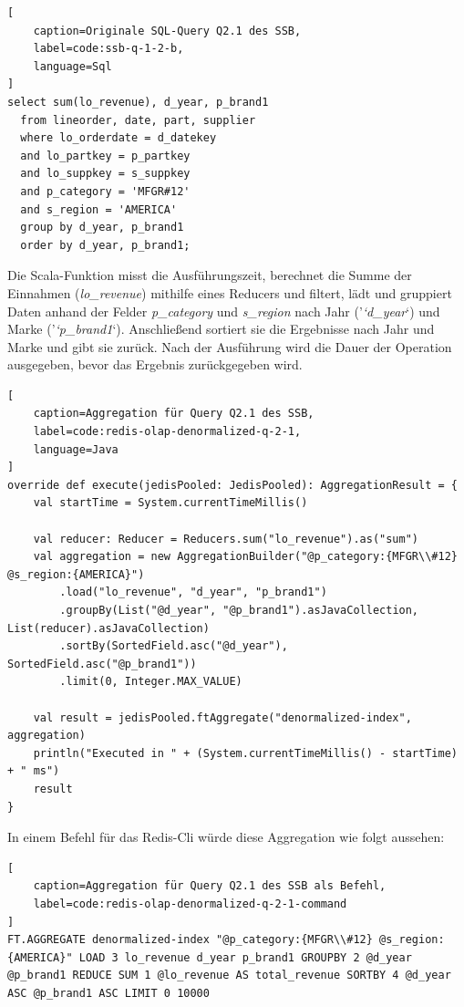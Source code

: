 \begin{lstlisting}[
    caption=Originale SQL-Query Q2.1 des SSB,
    label=code:ssb-q-1-2-b,
    language=Sql
]
select sum(lo_revenue), d_year, p_brand1
  from lineorder, date, part, supplier
  where lo_orderdate = d_datekey
  and lo_partkey = p_partkey
  and lo_suppkey = s_suppkey
  and p_category = 'MFGR#12'
  and s_region = 'AMERICA'
  group by d_year, p_brand1
  order by d_year, p_brand1;
\end{lstlisting}


Die Scala-Funktion misst die Ausführungszeit, berechnet die Summe der Einnahmen (\emph{lo\_revenue}) mithilfe eines Reducers und filtert, lädt und gruppiert Daten anhand der Felder \emph{p\_category} und \emph{s\_region} nach Jahr ('\emph{`d\_year}`) und Marke ('\emph{`p\_brand1}`). Anschließend sortiert sie die Ergebnisse nach Jahr und Marke und gibt sie zurück. Nach der Ausführung wird die Dauer der Operation ausgegeben, bevor das Ergebnis zurückgegeben wird.

\begin{lstlisting}[
    caption=Aggregation für Query Q2.1 des SSB,
    label=code:redis-olap-denormalized-q-2-1,
    language=Java
]
override def execute(jedisPooled: JedisPooled): AggregationResult = {
	val startTime = System.currentTimeMillis()

	val reducer: Reducer = Reducers.sum("lo_revenue").as("sum")
	val aggregation = new AggregationBuilder("@p_category:{MFGR\\#12} @s_region:{AMERICA}")
		.load("lo_revenue", "d_year", "p_brand1")
		.groupBy(List("@d_year", "@p_brand1").asJavaCollection, List(reducer).asJavaCollection)
		.sortBy(SortedField.asc("@d_year"), SortedField.asc("@p_brand1"))
		.limit(0, Integer.MAX_VALUE)

	val result = jedisPooled.ftAggregate("denormalized-index", aggregation)
	println("Executed in " + (System.currentTimeMillis() - startTime) + " ms")
	result
}
\end{lstlisting}

In einem Befehl für das Redis-Cli würde diese Aggregation wie folgt aussehen:
\begin{lstlisting}[
    caption=Aggregation für Query Q2.1 des SSB als Befehl,
    label=code:redis-olap-denormalized-q-2-1-command
]
FT.AGGREGATE denormalized-index "@p_category:{MFGR\\#12} @s_region:{AMERICA}" LOAD 3 lo_revenue d_year p_brand1 GROUPBY 2 @d_year @p_brand1 REDUCE SUM 1 @lo_revenue AS total_revenue SORTBY 4 @d_year ASC @p_brand1 ASC LIMIT 0 10000
\end{lstlisting}


